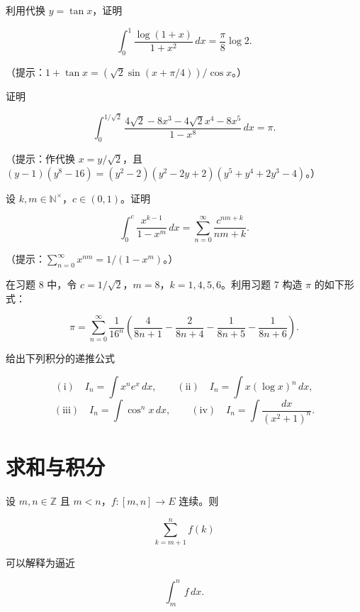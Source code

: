 \begin{exercises}
利用代换 $ y = \tan x $，证明

\[
\int_{0}^{1} \frac{\log(1 + x)}{1 + x^2} \, dx = \frac{\pi}{8} \log 2 .
\]

（提示：$ 1 + \tan x = (\sqrt{2} \sin(x + \pi/4))/\cos x $。）

\item

证明

\[
\int_{0}^{1/\sqrt{2}} \frac{4\sqrt{2} - 8x^3 - 4\sqrt{2}x^4 - 8x^5}{1 - x^8} \, dx = \pi .
\]

（提示：作代换 $ x = y/\sqrt{2} $，且 $ (y - 1)(y^8 - 16) = (y^2 - 2)(y^2 - 2y + 2)(y^5 + y^4 + 2y^3 - 4) $。）

\item

设 $ k, m \in \mathbb{N}^\times $，$ c \in (0, 1) $。证明

\[
\int_{0}^{c} \frac{x^{k-1}}{1 - x^m} \, dx = \sum_{n=0}^{\infty} \frac{c^{nm+k}}{nm + k} .
\]

（提示：$ \sum_{n=0}^{\infty} x^{nm} = 1/(1 - x^m) $。）

\item

在习题 8 中，令 $ c = 1/\sqrt{2} $，$ m = 8 $，$ k = 1, 4, 5, 6 $。利用习题 7 构造 $ \pi $ 的如下形式：

\[
\pi = \sum_{n=0}^{\infty} \frac{1}{16^n} \left( \frac{4}{8n + 1} - \frac{2}{8n + 4} - \frac{1}{8n + 5} - \frac{1}{8n + 6} \right) .
\]
\item

给出下列积分的递推公式

\[
\mathrm{(i)}\quad I_n = \int x^n e^x \, dx , \qquad \mathrm{(ii)}\quad I_n = \int x (\log x)^n \, dx ,
\]
\[
\mathrm{(iii)}\quad I_n = \int \cos^n x \, dx , \qquad \mathrm{(iv)}\quad I_n = \int \frac{dx}{(x^2 + 1)^n} .
\]
\end{exercises}

\section{求和与积分}

设 $ m, n \in \mathbb{Z} $ 且 $ m < n $，$ f : [m, n] \to E $ 连续。则

\[
\sum_{k=m+1}^{n} f(k)
\]

可以解释为逼近

\begin{equation}
\int_{m}^{n} f \, dx .\tag{6.1}
\end{equation}

